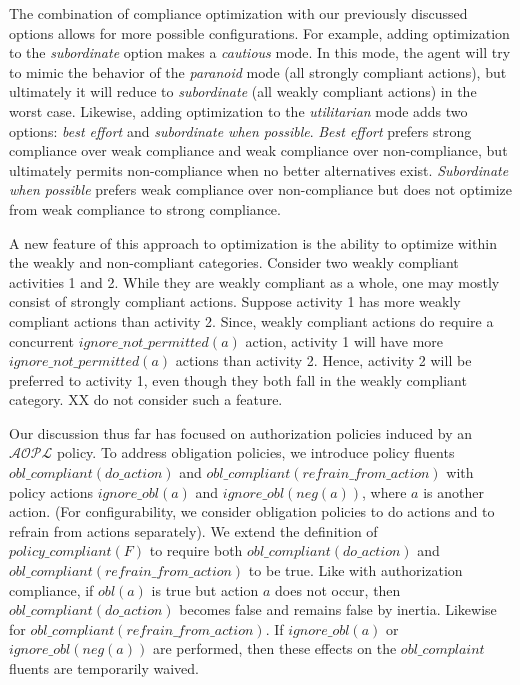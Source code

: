 The combination of compliance optimization with our previously discussed options allows for more possible configurations.
For example, adding optimization to the \textit{subordinate} option makes a \textit{cautious} mode.
In this mode, the agent will try to mimic the behavior of the \textit{paranoid} mode (all strongly compliant actions), but ultimately it will reduce to \textit{subordinate} (all weakly compliant actions) in the worst case.
Likewise, adding optimization to the \textit{utilitarian} mode adds two options: \textit{best effort} and \textit{subordinate when possible}.
\textit{Best effort} prefers strong compliance over weak compliance and weak compliance over non-compliance, but ultimately permits non-compliance when no better alternatives exist.
\textit{Subordinate when possible} prefers weak compliance over non-compliance but does not optimize from weak compliance to strong compliance.

A new feature of this approach to optimization is the ability to optimize within the weakly and non-compliant categories.
Consider two weakly compliant activities 1 and 2.
While they are weakly compliant as a whole, one may mostly consist of strongly compliant actions.
Suppose activity 1 has more weakly compliant actions than activity 2.
Since, weakly compliant actions do require a concurrent $ignore\_not\_permitted(a)$ action, activity 1 will have more $ignore\_not\_permitted(a)$ actions than activity 2.
Hence, activity 2 will be preferred to activity 1, even though they both fall in the weakly compliant category.
XX do not consider such a feature.

Our discussion thus far has focused on authorization policies induced by an $\mathcal{AOPL}$ policy.
To address obligation policies, we introduce policy fluents $obl\_compliant(do\_action)$ and $obl\_compliant(refrain\_from\_action)$ with policy actions $ignore\_obl(a)$ and $ignore\_obl(neg(a))$, where $a$ is another action.
(For configurability, we consider obligation policies to do actions and to refrain from actions separately).
We extend the definition of $policy\_compliant(F)$ to require both $obl\_compliant(do\_action)$ and $obl\_compliant(refrain\_from\_action)$ to be true.
Like with authorization compliance, if $obl(a)$ is true but action $a$ does not occur, then $obl\_compliant(do\_action)$ becomes false and remains false by inertia.
Likewise for $obl\_compliant(refrain\_from\_action)$.
If $ignore\_obl(a)$ or $ignore\_obl(neg(a))$ are performed, then these effects on the $obl\_complaint$ fluents are temporarily waived.

